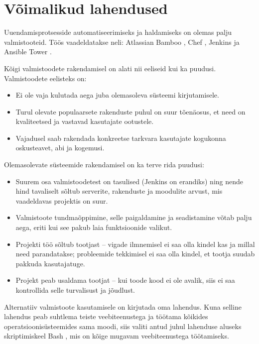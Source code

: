 \documentclass[12pt]{article}
\begin{document}
  \newpage
  
  \section{Võimalikud lahendused}
  
  Uuendamisprotsesside automatiseerimiseks ja haldamiseks on olemas palju valmistooteid. Töös vaadeldatakse neli: Atlassian Bamboo \cite{bamboo}, Chef \cite{chef}, Jenkins \cite{jenkins} ja Ansible Tower \cite{ansible}.
  
  Kõigi valmistoodete rakendamisel on alati nii eeliseid kui ka puudusi. Valmistoodete eelisteks on:
  \begin{itemize}
    \item Ei ole vaja kulutada aega juba olemasoleva süsteemi kirjutamisele.
    \item Turul olevate populaarsete rakenduste puhul on suur tõenäosus, et need on kvaliteetsed ja vastavad kasutajate ootustele.
    \item Vajadusel saab rakendada konkreetse tarkvara kasutajate kogukonna oskusteavet, abi ja kogemusi.
  \end{itemize}
  
  Olemasolevate süsteemide rakendamisel on ka terve rida puudusi:
  \begin{itemize}
    \item Suurem osa valmistoodetest on tasulised (Jenkins on erandiks) ning nende hind tavaliselt sõltub serverite, rakenduste ja moodulite arvust, mis vaadeldavas projektis on suur.
    \item Valmistoote tundmaõppimine, selle paigaldamine ja seadistamine võtab palju aega, eriti kui see pakub laia funktsioonide valikut.
    \item Projekti töö sõltub tootjast \--- vigade ilmnemisel ei saa olla kindel kas ja millal need parandatakse; probleemide tekkimisel ei saa olla kindel, et tootja suudab pakkuda kasutajatuge.
    \item Projekt peab usaldama tootjat \--- kui toode kood ei ole avalik, siis ei saa kontrollida selle turvalisust ja jõudlust.
  \end{itemize}
    
  Alternatiiv valmistoote kasutamisele on kirjutada oma lahendus. Kuna selline lahendus peab suhtlema teiste veebiteenustega ja töötama kõikides operatsioonisüsteemides sama moodi, siis valiti antud juhul lahenduse aluseks skriptimiskeel Bash \cite{bash,bash-book}, mis on kõige mugavam veebiteenustega töötamiseks.
  
\end{document}
